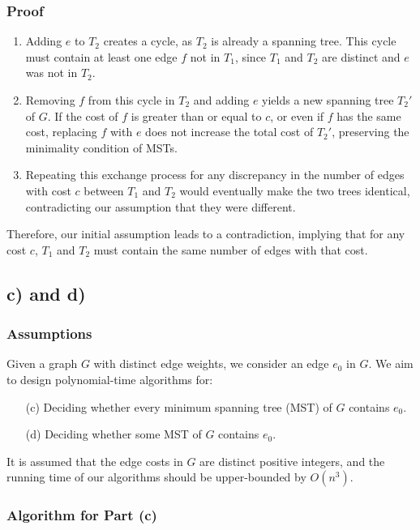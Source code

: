 \documentclass{article}
\begin{document}
\subsubsection{Proof}
\begin{enumerate}
    \item Adding \(e\) to \(T_2\) creates a cycle, as \(T_2\) is already a spanning tree. This cycle must contain at least one edge \(f\) not in \(T_1\), since \(T_1\) and \(T_2\) are distinct and \(e\) was not in \(T_2\).
    \item Removing \(f\) from this cycle in \(T_2\) and adding \(e\) yields a new spanning tree \(T_2'\) of \(G\). If the cost of \(f\) is greater than or equal to \(c\), or even if \(f\) has the same cost, replacing \(f\) with \(e\) does not increase the total cost of \(T_2'\), preserving the minimality condition of MSTs.
    \item Repeating this exchange process for any discrepancy in the number of edges with cost \(c\) between \(T_1\) and \(T_2\) would eventually make the two trees identical, contradicting our assumption that they were different.
\end{enumerate}

Therefore, our initial assumption leads to a contradiction, implying that for any cost \(c\), \(T_1\) and \(T_2\) must contain the same number of edges with that cost.
\subsection{c) and d)}
\subsubsection{Assumptions }
Given a graph $G$ with distinct edge weights, we consider an edge $e_0$ in $G$. We aim to design polynomial-time algorithms for:
\begin{enumerate}
    \item[(c)] Deciding whether every minimum spanning tree (MST) of $G$ contains $e_0$.
    \item[(d)] Deciding whether some MST of $G$ contains $e_0$.
\end{enumerate}
It is assumed that the edge costs in $G$ are distinct positive integers, and the running time of our algorithms should be upper-bounded by $O(n^3)$.

\subsubsection{Algorithm for Part (c)}
\end{document}
